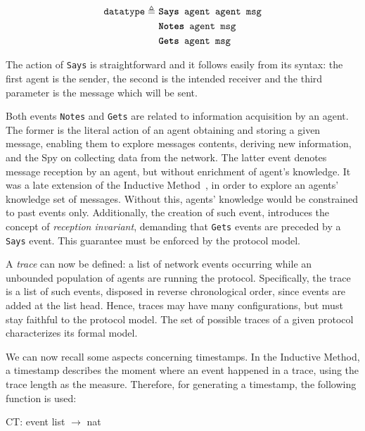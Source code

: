 \begin{equation*}
  \begin{split}
    \texttt{datatype} \triangleq\
    & \texttt{\textbf{Says} agent agent msg} \\
    & \texttt{\textbf{Notes} agent msg} \\
    & \texttt{\textbf{Gets} agent msg}
  \end{split}
\end{equation*}

The action of \texttt{Says} is straightforward and it follows easily from its syntax: the first agent is the sender, the second is the intended receiver and the third parameter is the message which will be sent.

Both events \texttt{Notes} and \texttt{Gets} are related to information acquisition by an agent. The former is the literal action of an agent obtaining and storing a given message, enabling them to explore messages contents, deriving new information, and the Spy on collecting data from the network. The latter event denotes message reception by an agent, but without enrichment of agent's knowledge. It was a late extension of the Inductive Method~\cite[Ch. 8]{Bella2007}, in order to explore an agents' knowledge set of messages. Without this, agents' knowledge would be constrained to past events only. Additionally, the creation of such event, introduces the concept of \textit{reception invariant}, demanding that \texttt{Gets} events are preceded by a \texttt{Says} event. This guarantee must be enforced by the protocol model.

A \textit{trace} can now be defined: a list of network events occurring while an unbounded population of agents are running the protocol. Specifically, the trace is a list of such events, disposed in reverse chronological order, since events are added at the list head. Hence, traces may have many configurations, but must stay faithful to the protocol model. The set of possible traces of a given protocol characterizes its formal model.

We can now recall some aspects concerning timestamps. In the Inductive Method, a timestamp describes the moment where an event happened in a trace, using the trace length as the measure. Therefore, for generating a timestamp, the following function is used:

\begin{center}
  {\ttfamily CT\@: event list \(\longrightarrow \) nat}
\end{center}

